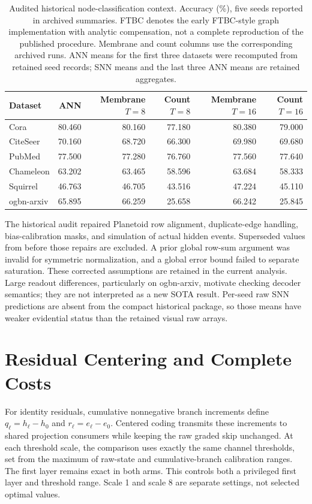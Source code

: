 \documentclass[10pt,twocolumn,letterpaper]{article}
\begin{document}
\begin{table}[t]\centering\small
\caption{Audited historical node-classification context. Accuracy (\%), five seeds reported in archived summaries. FTBC denotes the early FTBC-style graph implementation with analytic compensation, not a complete reproduction of the published procedure. Membrane and count columns use the corresponding archived runs. ANN means for the first three datasets were recomputed from retained seed records; SNN means and the last three ANN means are retained aggregates.}
\label{tab:nodes}
\begin{tabular}{lrrrrr}\toprule
Dataset & ANN & Membrane $T=8$ & Count $T=8$ & Membrane $T=16$ & Count $T=16$\\\midrule
Cora &80.460&80.160&77.180&80.380&79.000\\
CiteSeer &70.160&68.720&66.300&69.980&69.680\\
PubMed &77.500&77.280&76.760&77.560&77.640\\
Chameleon &63.202&63.465&58.596&63.684&58.333\\
Squirrel &46.763&46.705&43.516&47.224&45.110\\
ogbn-arxiv &65.895&66.259&25.658&66.242&25.845\\\bottomrule
\end{tabular}\end{table}

The historical audit repaired Planetoid row alignment, duplicate-edge handling, bias-calibration masks, and simulation of actual hidden events. Superseded values from before those repairs are excluded. A prior global row-sum argument was invalid for symmetric normalization, and a global error bound failed to separate saturation. These corrected assumptions are retained in the current analysis. Large readout differences, particularly on ogbn-arxiv, motivate checking decoder semantics; they are not interpreted as a new SOTA result. Per-seed raw SNN predictions are absent from the compact historical package, so those means have weaker evidential status than the retained visual raw arrays.

\section{Residual Centering and Complete Costs}
For identity residuals, cumulative nonnegative branch increments define $q_\ell=h_\ell-h_0$ and $r_\ell=e_\ell-e_0$. Centered coding transmits these increments to shared projection consumers while keeping the raw graded skip unchanged. At each threshold scale, the comparison uses exactly the same channel thresholds, set from the maximum of raw-state and cumulative-branch calibration ranges. The first layer remains exact in both arms. This controls both a privileged first layer and threshold range. Scale 1 and scale 8 are separate settings, not selected optimal values.
\end{document}
